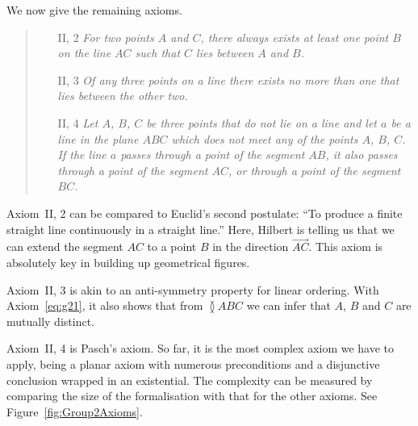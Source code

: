 We now give the remaining axioms.
\begin{quotation}
\mbox{}\vspace{-\baselineskip}
\begin{enumerate}
\item[II, 2] \emph{For two points $A$ and $C$, there always exists at least one point $B$ on the line $AC$ such that $C$ lies between $A$ and $B$.}
  \item[II, 3] \emph{Of any three points on a line there exists no more than one that lies between the other two.}
  \item[II, 4] \emph{Let $A$, $B$, $C$ be three points that do not lie on a line and let $a$ be a line in the plane $ABC$ which does not meet any of the points $A$, $B$, $C$. If the line $a$ passes through a point of the segment $AB$, it also passes through a point of the segment $AC$, or through a point of the segment $BC$.}
\end{enumerate}
\end{quotation}

Axiom~II, 2 can be compared to Euclid's second postulate: ``To produce a finite straight line continuously in a straight line.'' Here, Hilbert is telling us that we can extend the segment $AC$ to a point $B$ in the direction $\overrightarrow{AC}$. This axiom is absolutely key in building up geometrical figures.

Axiom~II, 3 is akin to an anti-symmetry property for linear ordering. With Axiom~\ref{eq:g21}, it also shows that from $\between{A}{B}{C}$ we can infer that $A$, $B$ and $C$ are mutually distinct.

Axiom~II, 4 is Pasch's axiom. So far, it is the most complex axiom we have to apply, being a planar axiom with numerous preconditions and a disjunctive conclusion wrapped in an existential. The complexity can be measured by comparing the size of the formalisation with that for the other axioms. See Figure~\ref{fig:Group2Axioms}.

